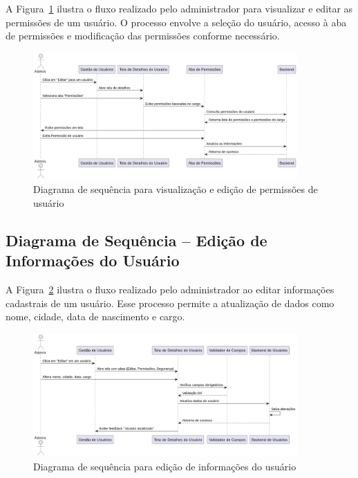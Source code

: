 A Figura~\ref{fig:diagrama-permissoes} ilustra o fluxo realizado pelo administrador para visualizar e editar as permissões de um usuário. O processo envolve a seleção do usuário, acesso à aba de permissões e modificação das permissões conforme necessário.

\begin{figure}[H]
    \centering
    \includegraphics[width=0.9\textwidth]{images/diagramasdesequencias/userEditPermissions.png}
    \caption{Diagrama de sequência para visualização e edição de permissões de usuário}
    \label{fig:diagrama-permissoes}
\end{figure}

\subsection{Diagrama de Sequência – Edição de Informações do Usuário}

A Figura~\ref{fig:diagrama-edicao-usuario} ilustra o fluxo realizado pelo administrador ao editar informações cadastrais de um usuário. Esse processo permite a atualização de dados como nome, cidade, data de nascimento e cargo.

\begin{figure}[H]
    \centering
    \includegraphics[width=0.9\textwidth]{images/diagramasdesequencias/userEdit.png}
    \caption{Diagrama de sequência para edição de informações do usuário}
    \label{fig:diagrama-edicao-usuario}
\end{figure}

